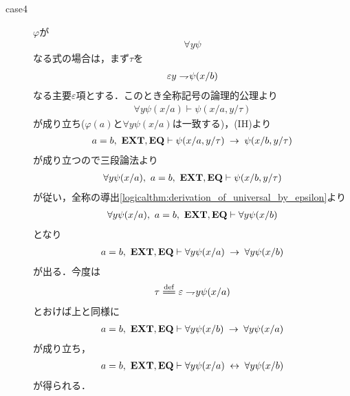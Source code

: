 \begin{sketch}
\begin{description}
\begin{description}
					\item[case4]
						$\varphi$が
						\begin{align}
							\forall y \psi
						\end{align}
						なる式の場合は，まず$\tau$を
						\begin{align}
							\varepsilon y \rightharpoondown\hspace{-0.25em} \psi(x/b)
						\end{align}
						なる主要$\varepsilon$項とする．このとき全称記号の論理的公理より
						\begin{align}
							\forall y \psi(x/a) \vdash \psi(x/a,y/\tau)
						\end{align}
						が成り立ち($\varphi(a)$と$\forall y \psi(x/a)$は一致する)，(IH)より
						\begin{align}
							a = b,\ \mbox{{\bf EXT}},\mbox{{\bf EQ}} \vdash 
							\psi(x/a,y/\tau) \hspace{0.25em}\rightarrow\hspace{0.25em} \psi(x/b,y/\tau)
						\end{align}
						が成り立つので三段論法より
						\begin{align}
							\forall y \psi(x/a),\ a = b,\ \mbox{{\bf EXT}},\mbox{{\bf EQ}} \vdash 
							\psi(x/b,y/\tau)
						\end{align}
						が従い，全称の導出\ref{logicalthm:derivation_of_universal_by_epsilon}より
						\begin{align}
							\forall y \psi(x/a),\ a = b,\ \mbox{{\bf EXT}},\mbox{{\bf EQ}} \vdash 
							\forall y \psi(x/b)
						\end{align}
						となり
						\begin{align}
							a = b,\ \mbox{{\bf EXT}},\mbox{{\bf EQ}} \vdash 
							\forall y \psi(x/a) \hspace{0.25em}\rightarrow\hspace{0.25em} \forall y \psi(x/b)
						\end{align}
						が出る．今度は
						\begin{align}
							\tau \defeq \varepsilon \negation y \psi(x/a)
						\end{align}
						とおけば上と同様に
						\begin{align}
							a = b,\ \mbox{{\bf EXT}},\mbox{{\bf EQ}} \vdash 
							\forall y \psi(x/b) \hspace{0.25em}\rightarrow\hspace{0.25em} \forall y \psi(x/a)
						\end{align}
						が成り立ち，
						\begin{align}
							a = b,\ \mbox{{\bf EXT}},\mbox{{\bf EQ}} \vdash 
							\forall y \psi(x/a) \hspace{0.25em}\leftrightarrow\hspace{0.25em} \forall y \psi(x/b)
						\end{align}
						が得られる．
						\QED
				\end{description}
				

\end{description}
\end{sketch}
